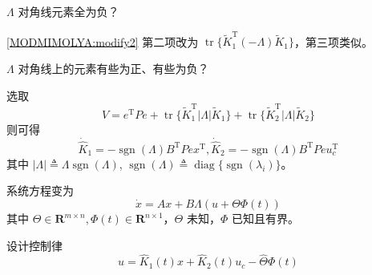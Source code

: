 \begin{problem}
    $\Lambda$ 对角线元素全为负？
\end{problem}
\begin{hint}
\eqref{MODMIMOLYA:modify2} 第二项改为 $\ensuremath{\operatorname{tr}} \{ \tilde{K}^\mathrm{T}_1 (- \Lambda) \tilde{K} _1 \}$，第三项类似。
\end{hint}
\begin{problem}
    $\Lambda$ 对角线上的元素有些为正、有些为负？
\end{problem}
\begin{hint}
    选取\[ V = e^\mathrm{T} P  e +\ensuremath{\operatorname{tr}} \{ \tilde{K}^\mathrm{T}_1 |
       \Lambda | \tilde{K} _1 \} +\ensuremath{\operatorname{tr}} \{
       \tilde{K}^\mathrm{T}_2 | \Lambda | \tilde{K} _2 \} \]
    则可得
    \[ \dot{\hat{K}} _1 = -\ensuremath{\operatorname{sgn}} (\Lambda) B^\mathrm{T}  P  e
       x^\mathrm{T}, \dot{\hat{K}} _2 = -\ensuremath{\operatorname{sgn}} (\Lambda) B^\mathrm{T}
       P  e  u^\mathrm{T}_c \]
    其中 $| \Lambda | \triangleq \Lambda \ensuremath{\operatorname{sgn}}
    (\Lambda)$, $\ensuremath{\operatorname{sgn}} (\Lambda) \triangleq
    \ensuremath{\operatorname{diag}} \{ \ensuremath{\operatorname{sgn}}
    (\lambda_i) \}$。
\end{hint}

\begin{problem}\label{Pro:uncertainty}
系统方程变为
  \begin{equation}
      \dot{x} = A  x + B \Lambda (u + \Theta\Phi (t))\label{Sys:MRAC:MIMO_with_dis}
  \end{equation}
  其中 $\Theta \in \mathbf{R}^{m \times n}, \Phi (t) \in \mathbf{R}^{n \times 1}$，$\Theta$ 未知，$\Phi$ 已知且有界。
\end{problem}
\begin{hint}
    设计控制律\[ u = \hat{K}_1 (t) x + \hat{K}_2 (t) u_c - \hat{\Theta}\Phi (t)  \]
\end{hint}
